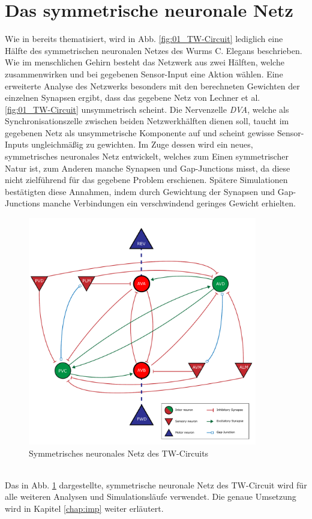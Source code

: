 \section{Das symmetrische neuronale Netz}
\label{sec:my_net}
	Wie in \cite{Wicks1996} bereits thematisiert, wird in Abb. \ref{fig:01_TW-Circuit} lediglich eine Hälfte des symmetrischen neuronalen Netzes des Wurms C. Elegans beschrieben. Wie im menschlichen Gehirn besteht das Netzwerk aus zwei Hälften, welche zusammenwirken und bei gegebenen Sensor-Input eine Aktion wählen. Eine erweiterte Analyse des Netzwerks besonders mit den berechneten Gewichten der einzelnen Synapsen ergibt, dass das gegebene Netz von Lechner et al. \ref{fig:01_TW-Circuit} unsymmetrisch scheint. Die Nervenzelle \textit{DVA}, welche als Synchronisationszelle zwischen beiden Netzwerkhälften dienen soll, taucht im gegebenen Netz als unsymmetrische Komponente auf und scheint gewisse Sensor-Inputs ungleichmäßig zu gewichten. Im Zuge dessen wird ein neues, symmetrisches neuronales Netz entwickelt, welches zum Einen symmetrischer Natur ist, zum Anderen manche Synapsen und Gap-Junctions misst, da diese nicht zielführend für das gegebene Problem erschienen. Spätere Simulationen bestätigten diese Annahmen, indem durch Gewichtung der Synapsen und Gap-Junctions manche Verbindungen ein verschwindend geringes Gewicht erhielten.
	\begin{figure}[!h] %
		\centering
		\includegraphics[width=10cm]{figures/chap_neuron/Neural_Net_v3_plain.pdf}
		\caption{Symmetrisches neuronales Netz des TW-Circuits}
		\label{fig:nn_new}
	\end{figure}\\
	Das in Abb. \ref{fig:nn_new} dargestellte, symmetrische neuronale Netz des TW-Circuit wird für alle weiteren Analysen und Simulationsläufe verwendet. Die genaue Umsetzung wird in Kapitel \ref{chap:imp} weiter erläutert.
	

